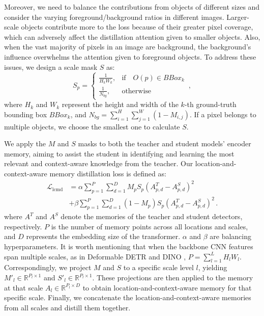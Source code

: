 Moreover, we need to balance the contributions from objects of different sizes and consider the varying foreground/background ratios in different images. Larger-scale objects contribute more to the loss because of their greater pixel coverage, which can adversely affect the distillation attention given to smaller objects. 
Also, when the vast majority of pixels in an image are background, the background's influence overwhelms the attention given to foreground objects.
To address these issues, we design a scale mask $S$ as:
\begin{equation}
S_{p} = \left\{
\begin{array}{cl}
\frac{1}{H_k W_k}, & \text{if} \quad O(p) \in BBox_k \\
\frac{1}{N_{bg}}, & \text{otherwise}
\end{array} \right. \,,
\end{equation}
\noindent where $H_k$ and $W_k$ represent the height and width of the $k$-th ground-truth bounding box $BBox_k$, and $N_{bg} = \sum_{i=1}^{H} \sum_{j=1}^{W} (1 - M_{i,j})$. If a pixel belongs to multiple objects, we choose the smallest one to calculate $S$.

We apply the $M$ and $S$ masks to both the teacher and student models' encoder memory, aiming to assist the student in identifying and learning the most relevant and context-aware knowledge from the teacher. Our location-and-context-aware memory distillation loss is defined as:
\begin{equation}\label{eq:lcmd}
\begin{aligned}
    \mathcal{L}_{\text{lcmd}} & = 
      \alpha \sum_{p=1}^{P} \sum_{d=1}^{D} M_{p} S_{p} ( A^T_{p,d} - A^S_{p,d})^2\\
     & + \beta \sum_{p=1}^{P} \sum_{d=1}^{D} (1- M_{p}) S_{p} ( A^T_{p,d} - A^S_{p,d})^2 \,.
\end{aligned}
\end{equation}
\noindent where $A^T$ and $A^S$ denote the memories of the teacher and student detectors, respectively. $P$ is the number of memory points across all locations and scales, and $D$ represents the embedding size of the transformer. $\alpha$ and $\beta$ are balancing hyperparameters. It is worth mentioning that when the backbone CNN features span multiple scales, as in Deformable DETR \cite{zhu2020deformable} and DINO \cite{zhang2023dino}, $P = \sum_{l=1}^L H_l W_l$. Correspondingly, we project $M$ and $S$ to a specific scale level $l$, yielding $M'_l \in \mathbb{R}^{P_l\times 1}$ and $S'_l \in \mathbb{R}^{P_l\times 1}$. These projections are then applied to the memory at that scale $A_l \in \mathbb{R}^{P_l\times D}$ to obtain location-and-context-aware memory for that specific scale. Finally, we concatenate the location-and-context-aware memories from all scales and distill them together.

